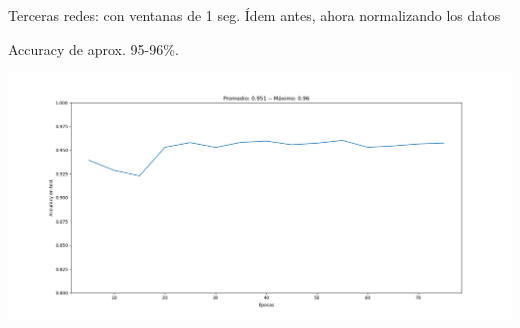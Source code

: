 \documentclass[presentation,9pt]{beamer}
\begin{document}
\begin{frame}{Terceras redes: con ventanas de 1 seg.}
Ídem antes, ahora normalizando los datos
	
	Accuracy de aprox. 95-96\%.
	
	\includegraphics[width=\textwidth]{./cnn_v7_1seg_normalizado_b5000.png}
	
	\end{frame}
\end{document}
